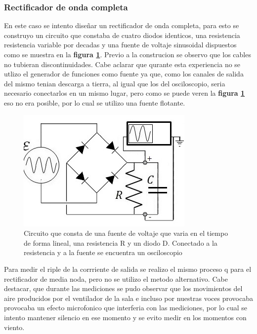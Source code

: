 \documentclass[11pt,a4paper]{article}
\begin{document}
\subsubsection{Rectificador de onda completa}
En este caso se intento diseñar un rectificador de onda completa, para esto se construyo un circuito que constaba de cuatro diodos identicos, una resistencia resistencia variable por decadas y una fuente de voltaje sinusoidal dispuestos como se muestra en la \textbf{figura \ref{fig:Rect-O}}. Previo a la construcion se observo que los cables no tubieran discontinuidades. Cabe aclarar que qurante esta experiencia no se utlizo el generador de funciones como fuente ya que, como los canales de salida del mismo tenian descarga a tierra, al igual que los del osciloscopio, seria necesario conectarlos en un mismo lugar, pero como se puede veren la \textbf{figura \ref{fig:Rect-O}} eso no era posible, por lo cual se utilizo una fuente flotante. 

\begin{figure}[H]
\centering
\includegraphics[scale=0.8]{Rectificador-Onda-Completa}
   \caption{Circuito que consta de una fuente de voltaje que varia en el tiempo de forma lineal, una resistencia R y un diodo D. Conectado a la resistencia y a la fuente se encuentra un osciloscopio}
   \label{fig:Rect-O}
\end{figure}

Para medir el riple de la corrriente de salida se realizo el mismo proceso q para el rectificador de media noda, pero no se utilizo el metodo alternativo. Cabe destacar, que durante las mediciones se pudo observar que los movimientos del aire producidos por el ventilador de la sala e incluso por nuestras voces provocaba provocaba un efecto microfonico que interferia con las mediciones, por lo cual se intento mantener silencio en ese momento y se evito medir en los momentos con viento.


\end{document}
